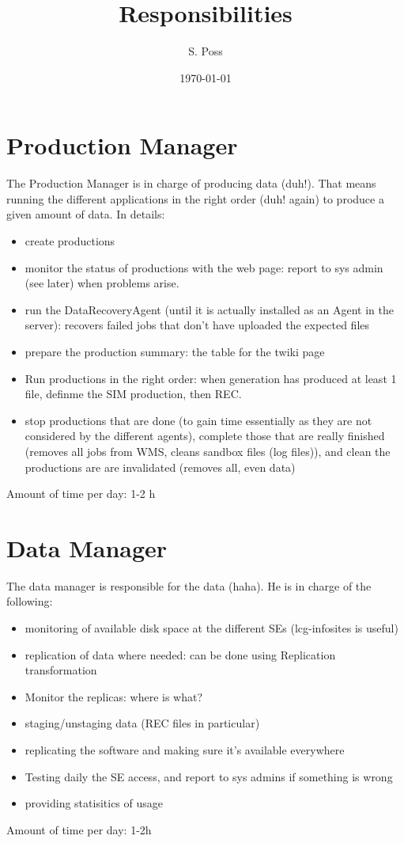 \documentclass[12pt]{article}
\title{Responsibilities}
\author{S. Poss}
\date{\today}
\begin{document}
\maketitle
{}

\section{Production Manager}
The Production Manager is in charge of producing data (duh!). That means
running the different applications in the right order (duh! again) to produce a
given amount of data. In details:
\begin{itemize}
  \item create productions
  \item monitor the status of productions with the web page: report to sys admin
  (see later) when problems arise.
  \item run the DataRecoveryAgent (until it is actually installed as an Agent
  in the server): recovers failed jobs that don't have uploaded the expected
  files
  \item prepare the production summary: the table for the twiki page
  \item Run productions in the right order: when generation has produced at
  least 1 file, definme the SIM production, then REC.
  \item stop productions that are done (to gain time essentially as they are
  not considered by the different agents), complete those that are really
  finished (removes all jobs from WMS, cleans sandbox files (log files)),
  and clean the productions are are invalidated (removes all, even data)
 \end{itemize}
 Amount of time per day: 1-2 h
 
\section{Data Manager}
The data manager is responsible for the data (haha). He is in charge of the
following:
\begin{itemize}
  \item monitoring of available disk space at the different SEs (lcg-infosites
  is useful)
  \item replication of data where needed: can be
  done using Replication transformation
  \item Monitor the replicas: where is what?
  \item staging/unstaging data (REC files in particular)
  \item replicating the software and making sure it's available
  everywhere
  \item Testing daily the SE access, and report to sys admins if something is
  wrong
  \item providing statisitics of usage
\end{itemize}
Amount of time per day: 1-2h
\end{document}
